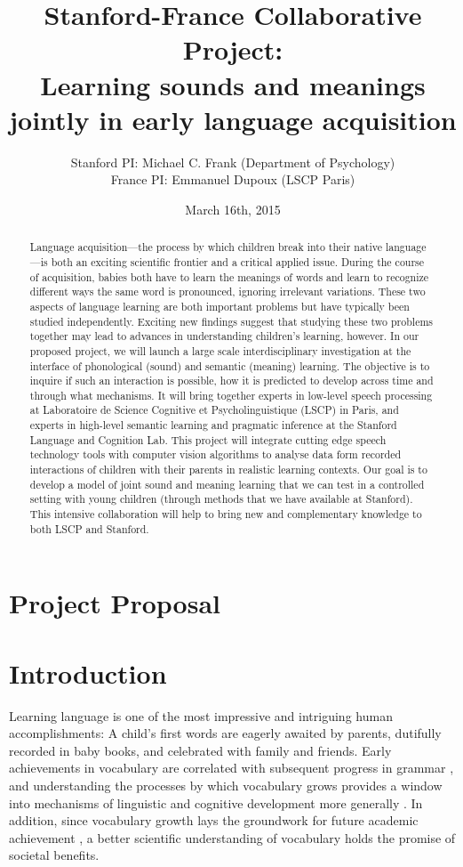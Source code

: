 \documentclass[12pt]{article}
\title{Stanford-France Collaborative Project: \\
Learning sounds and meanings jointly in early language acquisition}
\author{Stanford PI: Michael C. Frank (Department of Psychology) \\
France PI: Emmanuel Dupoux (LSCP Paris)}
\date{March 16th, 2015}
\begin{document}
\maketitle

\begin{abstract}
\noindent Language acquisition---the process by which children break into their native language---is both an exciting scientific frontier and a critical applied issue. During the course of acquisition, babies both have to learn the meanings of words and learn to recognize different ways the same word is pronounced, ignoring irrelevant variations. These two aspects of language learning are both important problems but have typically been studied independently. Exciting new findings suggest that studying these two problems together may lead to advances in understanding children's learning, however. In our proposed project, we will launch a large scale interdisciplinary investigation at the interface of phonological (sound) and semantic (meaning) learning. The objective is to inquire if such an interaction is possible, how it is predicted to develop across time and through what mechanisms. It will bring together experts in low-level speech processing at Laboratoire de Science Cognitive et Psycholinguistique (LSCP) in Paris, and experts in high-level semantic learning and pragmatic inference at the Stanford Language and Cognition Lab. This project will integrate cutting edge speech technology tools with computer vision algorithms to analyse data form recorded interactions of children with their parents in realistic learning contexts. Our goal is to develop a model of joint sound and meaning learning that we can test in a controlled setting with young children (through methods that we have available at Stanford). This intensive collaboration will help to bring new and complementary knowledge to both LSCP and Stanford.
\end{abstract}

\newpage

\section*{\centering Project Proposal}

\section{Introduction}


Learning language is one of the most impressive and intriguing human accomplishments: A child's first words are eagerly awaited by parents, dutifully recorded in baby books, and celebrated with family and friends. Early achievements in vocabulary are correlated with subsequent progress in grammar \cite{bates1999}, and understanding the processes by which vocabulary grows provides a window into mechanisms of linguistic and cognitive development more generally \cite{bloom2002}. In addition, since vocabulary growth lays the groundwork for future academic achievement \cite{hart1995,marchman2008}, a better scientific understanding of vocabulary holds the promise of societal benefits.
\end{document}
